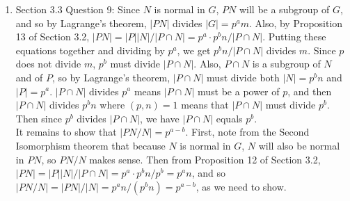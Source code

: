 \documentclass{article}
\begin{document}
\begin{enumerate}
  \item Section 3.3 Question 9: Since $N$ is normal in $G$, $PN$ will be a
    subgroup of $G$, and so by Lagrange's theorem, $|PN|$ divides
    $|G|=p^am$. Also, by Proposition 13 of Section 3.2,
    $|PN|=|P||N|/|P\cap N|=p^a\cdot p^bn/|P\cap N|$. Putting these
    equations together and dividing by $p^a$, we get $p^bn/|P\cap N|$
    divides $m$. Since $p$ does not divide $m$, $p^b$ must divide $|P\cap
    N|$. Also, $P\cap N$ is a subgroup of $N$ and of $P$, so by Lagrange's
    theorem, $|P\cap N|$ must divide both $|N|=p^bn$ and $|P|=p^a$. $|P\cap
    N|$ divides $p^a$ means $|P\cap N|$ must be a power of $p$, and then
    $|P\cap N|$ divides $p^bn$ where $(p,n)=1$ means that $|P\cap N|$ must
    divide $p^b$. Then since $p^b$ divides $|P\cap N|$, we have $|P\cap N|$
    equals $p^b$. \\

    It remains to show that $|PN/N|=p^{a-b}$. First, note from the Second
    Isomorphism theorem that because $N$ is normal in $G$, $N$ will also be
    normal in $PN$, so $PN/N$ makes sense. Then from Proposition 12 of
    Section 3.2, $|PN|=|P||N|/|P\cap N|=p^a\cdot p^bn/p^b=p^an$, and so
    $|PN/N|=|PN|/|N|=p^an/(p^bn)=p^{a-b}$, as we need to show.
\end{enumerate}
\end{document}
